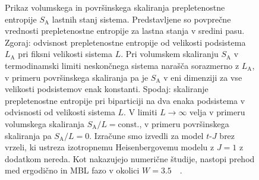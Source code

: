 \begin{figure}[H]
\caption{Prikaz volumskega in površinskega skaliranja prepletenostne entropije $S_\mathrm{A}$ lastnih stanj sistema. Predstavljene so povprečne vrednosti prepletenostne entropije za lastna stanja v sredini pasu.
Zgoraj: odvisnost prepletenostne entropije od velikosti podsistema $L_\mathrm{A}$ pri fiksni velikosti sistema $L$. Pri volumskem skaliranju $S_\mathrm{A}$ v termodinamski limiti neskončnega sistema narašča sorazmerno z $L_\mathrm{A}$, v primeru površinskega skaliranja pa je $S_\mathrm{A}$ v eni dimenziji za vse velikosti podsistemov enak konstanti. Spodaj: skaliranje prepletenostne entropije pri biparticiji na dva enaka podsistema v odvisnosti od velikosti sistema $L$. V limiti $L\to\infty$ velja v primeru volumskega skaliranja $S_\mathrm{A}/L=\mathrm{const.}$, v primeru površinskega skaliranja pa $S_\mathrm{A}/L=0.$ Izračune smo izvedli za model $t$-$J$ brez vrzeli, ki ustreza izotropnemu Heisenbergovemu modelu z $J=1$ z dodatkom nereda. Kot nakazujejo numerične študije, nastopi prehod med ergodično in MBL fazo  v okolici $W=3.5$~\cite{pal2010many}~\cite{luitz2015many}.}
\label{fig:W_sweep_ent_entropy_scaling_systems_14_0_7}
\end{figure}  
\newpage
